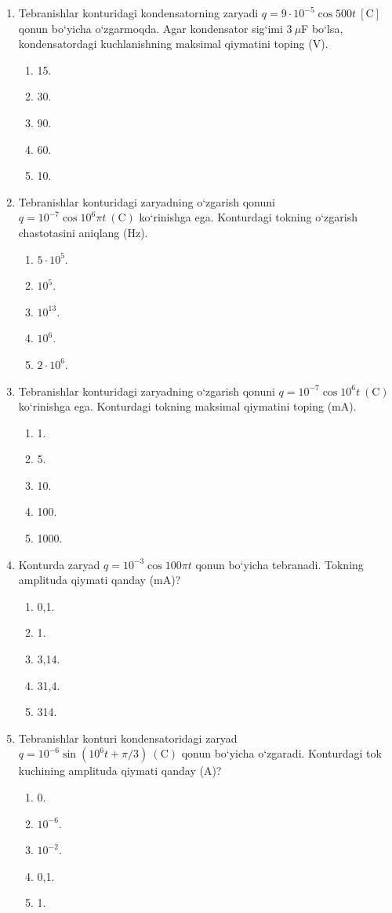 \begin{enumerate}
\item Tebranishlar konturidagi kondensatorning zaryadi $q=9\cdot10^{-5}\cos500t \ [\text{C}]$ qonun bo‘yicha o‘zgarmoqda. Agar kondensator sig‘imi $3~\mu$F bo‘lsa, kondensatordagi kuchlanishning maksimal qiymatini toping (V).
\begin{enumerate}[label=\Alph*)]
\item 15.
\item 30.
\item 90.
\item 60.
\item 10.
\end{enumerate}

\item Tebranishlar konturidagi zaryadning o‘zgarish qonuni $q=10^{-7}\cos10^6\pi t \ (\text{C})$ ko‘rinishga ega. Konturdagi tokning o‘zgarish chastotasini aniqlang (Hz).
\begin{enumerate}[label=\Alph*)]
\item $5\cdot10^5$.
\item $10^5$.
\item $10^{13}$.
\item $10^6$.
\item $2\cdot10^6$.
\end{enumerate}

\item Tebranishlar konturidagi zaryadning o‘zgarish qonuni $q=10^{-7}\cos10^6 t \ (\text{C})$ ko‘rinishga ega. Konturdagi tokning maksimal qiymatini toping (mA).
\begin{enumerate}[label=\Alph*)]
\item 1.
\item 5.
\item 10.
\item 100.
\item 1000.
\end{enumerate}

\item Konturda zaryad $q=10^{-3}\cos100\pi t$ qonun bo‘yicha tebranadi. Tokning amplituda qiymati qanday (mA)?
\begin{enumerate}[label=\Alph*)]
\item 0,1.
\item 1.
\item 3,14.
\item 31,4.
\item 314.
\end{enumerate}

\item Tebranishlar konturi kondensatoridagi zaryad $q=10^{-6}\sin(10^6t+\pi/3)\ (\text{C})$ qonun bo‘yicha o‘zgaradi. Konturdagi tok kuchining amplituda qiymati qanday (A)?
\begin{enumerate}[label=\Alph*)]
\item 0.
\item $10^{-6}$.
\item $10^{-2}$.
\item 0,1.
\item 1.
\end{enumerate}


\end{enumerate}
